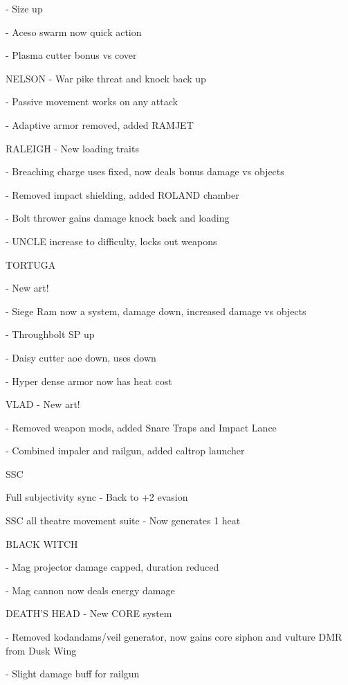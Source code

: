     -    Size up

    -    Aceso swarm now quick action

    -    Plasma cutter bonus vs cover


NELSON
    -    War pike threat and knock back up

    -    Passive movement works on any attack


    -    Adaptive armor removed, added RAMJET


RALEIGH
    -    New loading traits


    -    Breaching charge uses fixed, now deals bonus damage vs objects

    -    Removed impact shielding, added ROLAND chamber

    -    Bolt thrower gains damage knock back and loading


    -    UNCLE increase to difficulty, locks out weapons


TORTUGA

    -    New art!

    -    Siege Ram now a system, damage down, increased damage vs objects

    -    Throughbolt SP up


    -    Daisy cutter aoe down, uses down

    -    Hyper dense armor now has heat cost


VLAD
    -    New art!

    -    Removed weapon mods, added Snare Traps and Impact Lance

    -    Combined impaler and railgun, added caltrop launcher


                                                        SSC

Full subjectivity sync - Back to +2 evasion

SSC all theatre movement suite - Now generates 1 heat


BLACK WITCH





    -    Mag projector damage capped, duration reduced

    -    Mag cannon now deals energy damage


DEATH'S HEAD
    -    New CORE system

    -    Removed kodandams/veil generator, now gains core siphon and vulture DMR from Dusk Wing


    -    Slight damage buff for railgun


